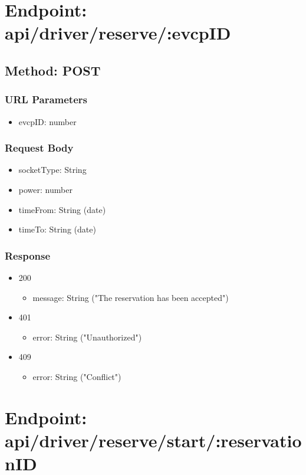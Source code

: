 \section*{Endpoint: api/driver/reserve/:evcpID}
\subsection*{Method: POST}
\subsubsection*{URL Parameters}
\begin{itemize}
    \item evcpID: number
\end{itemize}
\subsubsection*{Request Body}
\begin{itemize}
    \item socketType: String
    \item power: number
    \item timeFrom: String (date)
    \item timeTo: String (date)
\end{itemize}
\subsubsection*{Response}
\begin{itemize}
    \item 200
          \begin{itemize}
              \item message: String ("The reservation has been accepted")
          \end{itemize}
    \item 401
          \begin{itemize}
              \item error: String ("Unauthorized")
          \end{itemize}
    \item 409
          \begin{itemize}
              \item error: String ("Conflict")
          \end{itemize}
\end{itemize}

\section*{Endpoint: api/driver/reserve/start/:reservationID}
